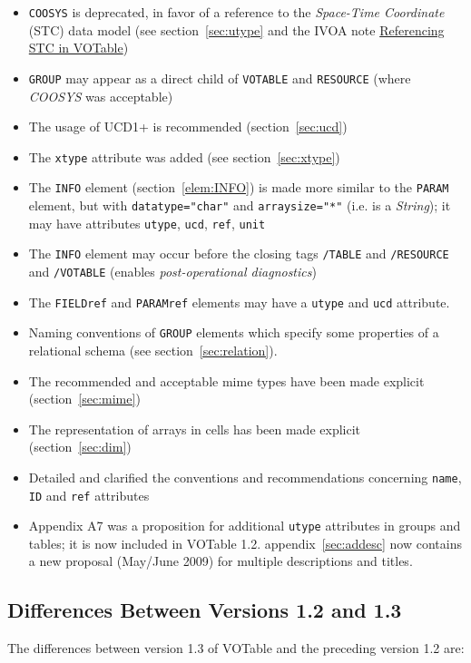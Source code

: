 \documentclass[11pt,a4paper]{ivoa}
\def\Arefs#1{section~\ref{#1}}
\def\Arefx#1{appendix~\ref{#1}}
\let\fg=\color
\def\attr#1{{\tt{\fg{DarkRed}#1}}}
\def\elem#1{{\tt{\fg{DarkRed}#1}}}
\def\attrval#1#2{{\tt{\fg{DarkRed}#1}="{\fg{DarkPurple}#2}"}}
\begin{document}
{{{\begin{itemize}
\item   \elem{COOSYS} is deprecated, in favor of a reference
        to the {\em Space-Time Coordinate} (STC) data model
        (see \Arefs{sec:utype} and the IVOA note
        \href{http://ivoa.net/documents/Notes/VOTableSTC/}{Referencing STC in VOTable})
\item  \elem{GROUP} may appear as a direct child of
	\elem{VOTABLE} and \elem{RESOURCE} (where {\em COOSYS} was
	acceptable)
\item  The usage of UCD1+ is recommended (\Arefs{sec:ucd})
\item  The \attr{xtype} attribute was added
	(see  \Arefs{sec:xtype})
\item  The {\elem{INFO}} element (\Arefs{elem:INFO}) is made
	more similar
        to the \elem{PARAM} element, but with \attrval{datatype}{char}
        and \attrval{arraysize}{*} (i.e. is a {\em String});
	it may have attributes \attr{utype},  \attr{ucd},
		\attr{ref}, \attr{unit}
\item  The {\elem{INFO}} element may occur before the closing
        tags \elem{/TABLE} and \elem{/RESOURCE}
        and \elem{/VOTABLE}
        (enables {\em post-operational diagnostics})
\item  The {\elem{FIELDref}} and {\elem{PARAMref}} elements may have
	a \attr{utype} and \attr{ucd} attribute.
\item  Naming conventions of \elem{GROUP} elements which specify some
        properties of a relational schema
	(see \Arefs{sec:relation}).
\item   The recommended and acceptable mime types have been made explicit
	(\Arefs{sec:mime})
\item   The representation of arrays in cells has been made explicit
	(\Arefs{sec:dim})
\item   Detailed and clarified the conventions and recommendations concerning
	\attr{name}, \attr{ID} and \attr{ref} attributes
\item	Appendix A7 was a proposition for additional \attr{utype}
        attributes in groups and tables; it is now included in VOTable 1.2.
	\Arefx{sec:addesc} now contains a new proposal
	(May/June 2009) for multiple descriptions and titles.
\end{itemize}

\subsection{Differences Between Versions 1.2 and 1.3}
\label{diff1.2-1.3}
The differences between version 1.3 of VOTable and the preceding
version 1.2 are:

}}}
\end{document}
